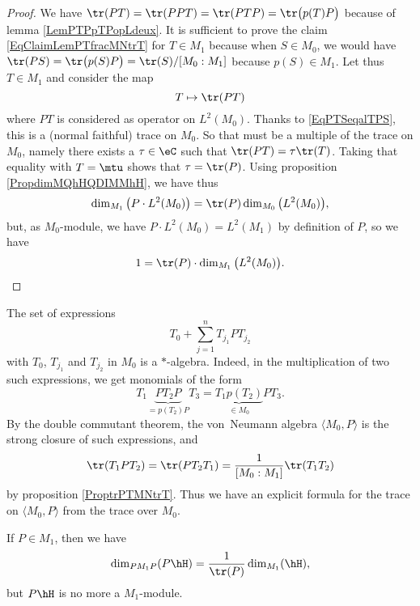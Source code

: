 \begin{proof}
We have $\tr(PT)=\tr(PPT)=\tr(PTP)=\tr\big( p(T)P \big)$ because of lemma \ref{LemPTPpTPopLdeux}. It is sufficient to prove the claim \eqref{EqClaimLemPTfracMNtrT} for $T\in M_1$ because when $S\in M_0$, we would have $\tr(PS)=\tr\big( p(S)P \big)=\tr(S)/[M_0:M_1]$ because $p(S)\in M_1$. Let thus $T\in M_1$ and consider the map
\begin{equation}
	T\mapsto \tr(PT)
\end{equation}
where $PT$ is considered as operator on $L^2(M_0)$. Thanks to \eqref{EqPTSeqalTPS}, this is a (normal faithful) trace on $M_0$. So that must be a multiple of the trace on $M_0$, namely there exists a $\tau\in\eC$ such that $\tr(PT)=\tau\tr(T)$. Taking that equality with $T=\mtu$ shows that $\tau=\tr(P)$. Using proposition \ref{PropdimMQhHQDIMMhH}, we have thus
\begin{equation}
	\dim_{M_1}\big( P\cdot L^2(M_0) \big)=\tr(P)\dim_{M_0}\big( L^2(M_0) \big),
\end{equation}
but, as $M_0$-module, we have $P\cdot L^2(M_0)=L^2(M_1)$ by definition of $P$, so we have
\begin{equation}
	1=\tr(P)\cdot \dim_{M_1}\big( L^2(M_0) \big).
\end{equation}

\end{proof}


The set of expressions 
\begin{equation}
	T_0+\sum_{j=1}^nT_{j_1}PT_{j_2}
\end{equation}
with $T_0$, $T_{j_1}$ and $T_{j_2}$ in $M_0$ is a $*$-algebra. Indeed, in the multiplication of two such expressions, we get monomials of the form
\begin{equation}
	T_1\underbrace{PT_2 P}_{=p(T_2)P}T_3=\underbrace{T_1p(T_2)}_{\in M_0}PT_3.
\end{equation}
By the double commutant theorem, the von~Neumann algebra $\langle M_0, P\rangle $ is the strong closure of such expressions, and
\begin{equation}
	\tr(T_1PT_2)=\tr(PT_2T_1)=\frac{1}{ [M_0:M_1] }\tr(T_1T_2)
\end{equation}
by proposition \ref{ProptrPTMNtrT}. Thus we have an explicit formula for the trace on $\langle M_0, P\rangle $ from the trace over $M_0$.

\begin{lemma}		\label{lemPhHPNPfrac}
If $P\in M_1$, then we have
\begin{equation}
	\dim_{PM_1P}( P\hH)=\frac{1}{ \tr(P) }\dim_{M_1}(\hH),
\end{equation}
but $P\hH$ is no more a $M_1$-module.
\end{lemma}

